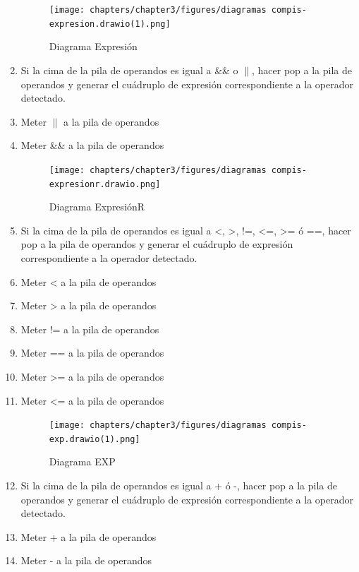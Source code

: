 \begin{enumerate}
    \newpage
    
    \begin{figure}[!htbp]
            \centering
            \texttt{[image: chapters/chapter3/figures/diagramas compis-expresion.drawio(1).png]}
            \caption{Diagrama Expresión}
            \label{fig:my_label}
    \end{figure}
    \FloatBarrier
    
    \item Si la cima de la pila de operandos es igual a \&\& o $\parallel$, hacer pop a la pila de operandos y generar el cuádruplo de expresión correspondiente a la operador detectado.
    \item Meter $\parallel$ a la pila de operandos
    \item Meter \&\& a la pila de operandos
    
    \newpage
    
    
    \begin{figure}[!htbp]
            \centering
            \texttt{[image: chapters/chapter3/figures/diagramas compis-expresionr.drawio.png]}
            \caption{Diagrama ExpresiónR}
            \label{fig:my_label}
    \end{figure}
    \FloatBarrier
    
    \item Si la cima de la pila de operandos es igual a <, >, !=, <=, >= ó ==, hacer pop a la pila de operandos y generar el cuádruplo de expresión correspondiente a la operador detectado.
    \item Meter < a la pila de operandos
    \item Meter > a la pila de operandos
    \item Meter != a la pila de operandos
    \item Meter == a la pila de operandos
    \item Meter >= a la pila de operandos
    \item Meter <= a la pila de operandos
    \newpage
    
    \begin{figure}[!htbp]
            \centering
            \texttt{[image: chapters/chapter3/figures/diagramas compis-exp.drawio(1).png]}
            \caption{Diagrama EXP}
            \label{fig:my_label}
    \end{figure}
    \FloatBarrier
    
    \item Si la cima de la pila de operandos es igual a + ó -, hacer pop a la pila de operandos y generar el cuádruplo de expresión correspondiente a la operador detectado.
    \item Meter + a la pila de operandos
    \item Meter - a la pila de operandos
    \newpage
    

\end{enumerate}
